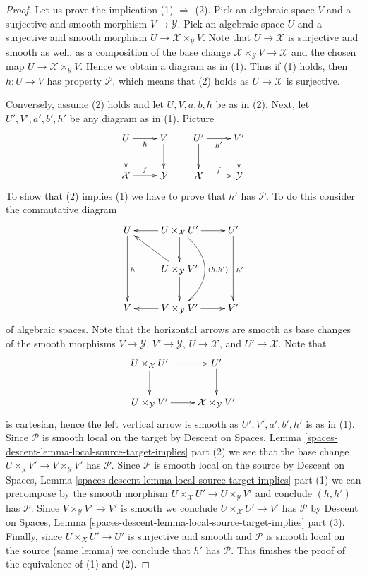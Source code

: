 \documentclass[10pt,a4paper]{amsart}
\theoremstyle{plain}
\theoremstyle{definition}
\theoremstyle{remark}
\numberwithin{equation}{subsection}
\begin{document}
\begin{proof}
Let us prove the implication (1) $\Rightarrow$ (2). Pick an algebraic
space $V$ and a surjective and smooth morphism $V \to \mathcal{Y}$.
Pick an algebraic space $U$ and a surjective and smooth morphism
$U \to \mathcal{X} \times_\mathcal{Y} V$. Note that $U \to \mathcal{X}$
is surjective and smooth as well, as a composition of the base change
$\mathcal{X} \times_\mathcal{Y} V \to \mathcal{X}$ and the chosen
map $U \to \mathcal{X} \times_\mathcal{Y} V$. Hence we obtain a
diagram as in (1). Thus if (1) holds, then $h : U \to V$ has property
$\mathcal{P}$, which means that (2) holds as $U \to \mathcal{X}$ is surjective.

\medskip\noindent
Conversely, assume (2) holds and let $U, V, a, b, h$ be as in (2).
Next, let $U', V', a', b', h'$ be any diagram as in (1).
Picture
$$
\xymatrix{
U \ar[d] \ar[r]_h & V \ar[d] \\
\mathcal{X} \ar[r]^f & \mathcal{Y}
}
\quad\quad
\xymatrix{
U' \ar[d] \ar[r]_{h'} & V' \ar[d] \\
\mathcal{X} \ar[r]^f & \mathcal{Y}
}
$$
To show that (2) implies (1) we have to prove that $h'$ has $\mathcal{P}$.
To do this consider the commutative diagram
$$
\xymatrix{
U \ar[dd]^h &
U \times_\mathcal{X} U' \ar[d] \ar[l] \ar@/^6ex/[dd]^{(h, h')} \ar[r] &
U' \ar[dd]^{h'} \\
& U \times_\mathcal{Y} V' \ar[lu] \ar[d] & \\
V &
V \times_\mathcal{Y} V' \ar[l] \ar[r] &
V'
}
$$
of algebraic spaces. Note that the horizontal arrows are
smooth as base changes of the smooth morphisms
$V \to \mathcal{Y}$, $V' \to \mathcal{Y}$, $U \to \mathcal{X}$, and
$U' \to \mathcal{X}$. Note that
$$
\xymatrix{
U \times_\mathcal{X} U' \ar[d] \ar[r] & U' \ar[d] \\
U \times_\mathcal{Y} V' \ar[r] & \mathcal{X} \times_\mathcal{Y} V'
}
$$
is cartesian, hence the left vertical arrow is smooth as
$U', V', a', b', h'$ is as in (1).
Since $\mathcal{P}$ is smooth local on the target by
Descent on Spaces, Lemma
\ref{spaces-descent-lemma-local-source-target-implies} part (2)
we see
that the base change $U \times_\mathcal{Y} V' \to V \times_\mathcal{Y} V'$
has $\mathcal{P}$. Since $\mathcal{P}$ is smooth local on the source by
Descent on Spaces, Lemma
\ref{spaces-descent-lemma-local-source-target-implies} part (1)
we can precompose by the smooth morphism
$U \times_\mathcal{X} U' \to U \times_\mathcal{Y} V'$ and
conclude $(h, h')$ has $\mathcal{P}$.
Since $V \times_\mathcal{Y} V' \to V'$ is smooth we conclude
$U \times_\mathcal{X} U' \to V'$ has $\mathcal{P}$ by
Descent on Spaces, Lemma
\ref{spaces-descent-lemma-local-source-target-implies} part (3).
Finally, since $U \times_X U' \to U'$
is surjective and smooth and $\mathcal{P}$ is smooth local
on the source (same lemma) we conclude
that $h'$ has $\mathcal{P}$. This finishes the proof of the equivalence
of (1) and (2).


\end{proof}
\end{document}
